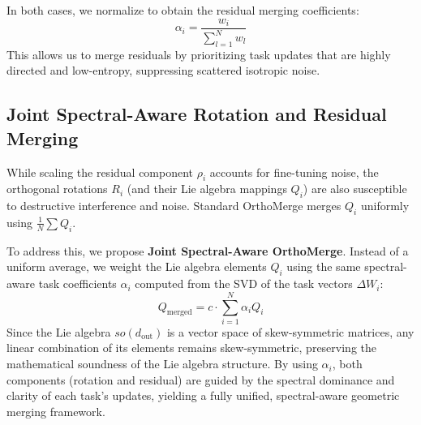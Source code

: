\documentclass{article}
\theoremstyle{plain}
\theoremstyle{definition}
\theoremstyle{remark}
\begin{document}
In both cases, we normalize to obtain the residual merging coefficients:
\begin{equation}
  \alpha_i = \frac{w_i}{\sum_{l=1}^N w_l}
\end{equation}
This allows us to merge residuals by prioritizing task updates that are highly directed and low-entropy, suppressing scattered isotropic noise.

\subsection{Joint Spectral-Aware Rotation and Residual Merging}
While scaling the residual component $\rho_i$ accounts for fine-tuning noise, the orthogonal rotations $R_i$ (and their Lie algebra mappings $Q_i$) are also susceptible to destructive interference and noise. Standard OrthoMerge merges $Q_i$ uniformly using $\frac{1}{N} \sum Q_i$. 

To address this, we propose \textbf{Joint Spectral-Aware OrthoMerge}. Instead of a uniform average, we weight the Lie algebra elements $Q_i$ using the same spectral-aware task coefficients $\alpha_i$ computed from the SVD of the task vectors $\Delta W_i$:
\begin{equation}
  Q_{\text{merged}} = c \cdot \sum_{i=1}^N \alpha_i Q_i
\end{equation}
Since the Lie algebra $so(d_{\text{out}})$ is a vector space of skew-symmetric matrices, any linear combination of its elements remains skew-symmetric, preserving the mathematical soundness of the Lie algebra structure. By using $\alpha_i$, both components (rotation and residual) are guided by the spectral dominance and clarity of each task's updates, yielding a fully unified, spectral-aware geometric merging framework.
\end{document}
